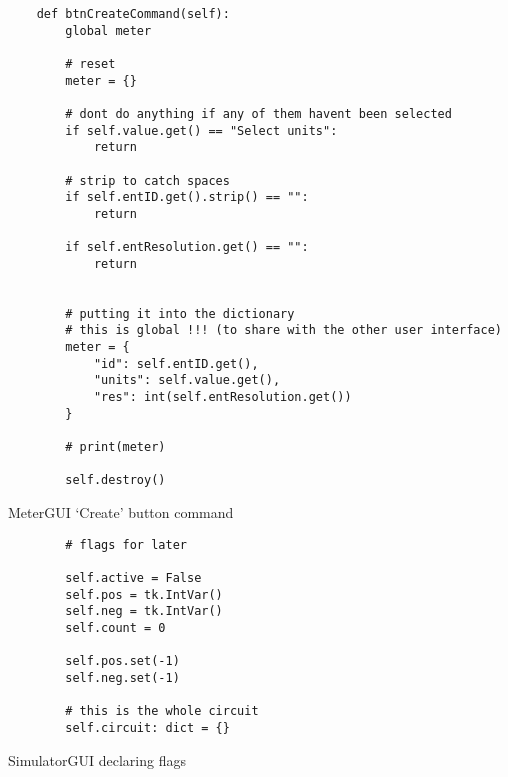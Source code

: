 \newpage
\begin{listing}[!ht]
    \begin{verbatim}
    def btnCreateCommand(self):
        global meter

        # reset
        meter = {}
        
        # dont do anything if any of them havent been selected
        if self.value.get() == "Select units":
            return
        
        # strip to catch spaces
        if self.entID.get().strip() == "":
            return
        
        if self.entResolution.get() == "":
            return
        
        
        # putting it into the dictionary
        # this is global !!! (to share with the other user interface)
        meter = {
            "id": self.entID.get(),
            "units": self.value.get(),
            "res": int(self.entResolution.get())
        }
        
        # print(meter)
        
        self.destroy()
    \end{verbatim}
    \caption{MeterGUI `Create' button command}
    \label{sc:metergui-create-btn-command}
\end{listing}


\newpage
\begin{listing}[!ht]
    \begin{verbatim}
        # flags for later

        self.active = False
        self.pos = tk.IntVar()
        self.neg = tk.IntVar()
        self.count = 0
        
        self.pos.set(-1)
        self.neg.set(-1)
        
        # this is the whole circuit
        self.circuit: dict = {}
    \end{verbatim}
    \caption{SimulatorGUI declaring flags}
    \label{sc:simgui-declare-flags}
\end{listing}

